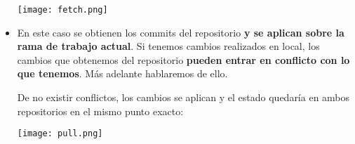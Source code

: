 \begin{itemize}
    \begin{center}
        \texttt{[image: fetch.png]}
    \end{center}


    \item {}

    En este caso se obtienen los commits del repositorio \textbf{y se aplican sobre la rama de trabajo actual}. Si tenemos cambios realizados en local, los cambios que obtenemos del repositorio \textbf{pueden entrar en conflicto con lo que tenemos}. Más adelante hablaremos de ello.

    De no existir conflictos, los cambios se aplican y el estado quedaría en ambos repositorios en el mismo punto exacto:

    \begin{center}
        \texttt{[image: pull.png]}
    \end{center}
\end{itemize}

